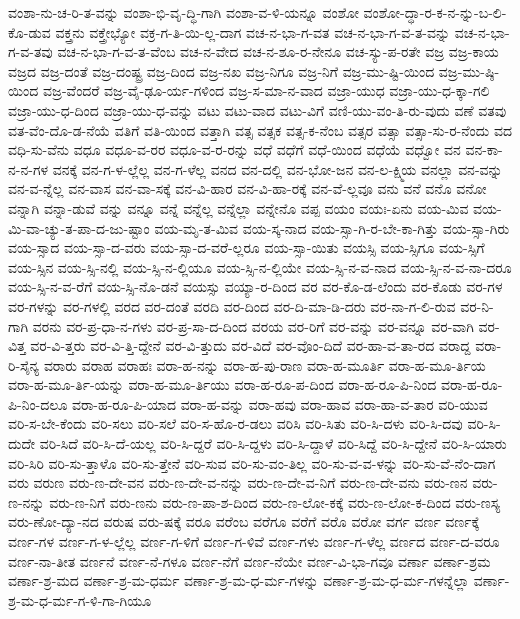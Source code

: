 {ವಂಶಾ-ನು-ಚ-ರಿ-ತ-ವನ್ನು
ವಂಶಾ-ಭಿ-ವೃ-ದ್ಧಿ-ಗಾಗಿ
ವಂಶಾ-ವ-ಳಿ-ಯನ್ನೂ
ವಂಶೋ
ವಂಶೋ-ದ್ಧಾ-ರ-ಕ-ನ-ನ್ನು-ಬ-ಲಿ-ಕೊ-ಡುವ
ವಕ್ತ್ರನು
ವಕ್ತ್ರೇಭ್ಯೋ
ವಕ್ರ-ಗ-ತಿ-ಯಿ-ಲ್ಲ-ದಾಗ
ವಚ-ನ-ಭಾ-ಗ-ವತ
ವಚ-ನ-ಭಾ-ಗ-ವ-ತ-ವನ್ನು
ವಚ-ನ-ಭಾ-ಗ-ವ-ತವು
ವಚ-ನ-ಭಾ-ಗ-ವ-ತ-ವೆಂಬ
ವಚ-ನ-ವೇದ
ವಚ-ನ-ಶೂ-ರ-ನೇನೂ
ವಚ-ಸ್ಯು-ಪ-ರತೇ
ವಜ್ರ
ವಜ್ರ-ಕಾಯ
ವಜ್ರದ
ವಜ್ರ-ದಂತೆ
ವಜ್ರ-ದಂಷ್ಟ್ರ
ವಜ್ರ-ದಿಂದ
ವಜ್ರ-ನಖ
ವಜ್ರ-ನಿಗೂ
ವಜ್ರ-ನಿಗೆ
ವಜ್ರ-ಮು-ಷ್ಟಿ-ಯಿಂದ
ವಜ್ರ-ಮು-ಷ್ಠಿ-ಯಿಂದ
ವಜ್ರ-ವೆಂದರೆ
ವಜ್ರ-ವೈ-ಢೂ-ರ್ಯ-ಗಳಿಂದ
ವಜ್ರ-ಸ-ಮಾ-ನ-ವಾದ
ವಜ್ರಾ-ಯುಧ
ವಜ್ರಾ-ಯು-ಧ-ಕ್ಕಾ-ಗಲಿ
ವಜ್ರಾ-ಯು-ಧ-ದಿಂದ
ವಜ್ರಾ-ಯು-ಧ-ವನ್ನು
ವಟು
ವಟು-ವಾದ
ವಟು-ವಿಗೆ
ವಣಿ-ಯು-ವಂ-ತಿ-ರು-ವುದು
ವಣೆ
ವತವು
ವತ-ವೆಂ-ದೊ-ಡ-ನೆಯೆ
ವತಿಗೆ
ವತಿ-ಯಿಂದ
ವತ್ತಾಗಿ
ವತ್ಸ
ವತ್ಸಕ
ವತ್ಸ-ಕ-ನೆಂಬ
ವತ್ಸರ
ವತ್ಸಾ
ವತ್ಸಾ-ಸು-ರ-ನೆಂದು
ವದ
ವಧಿ-ಸು-ವೆನು
ವಧೂ
ವಧೂ-ವ-ರರ
ವಧೂ-ವ-ರ-ರನ್ನು
ವಧೆ
ವಧೆಗೆ
ವಧೆ-ಯಿಂದ
ವಧೆಯೆ
ವಧ್ವೋ
ವನ
ವನ-ಕಾ-ನ-ನ-ಗಳ
ವನಕ್ಕೆ
ವನ-ಗ-ಳ-ಲ್ಲೆಲ್ಲ
ವನ-ಗ-ಳೆಲ್ಲ
ವನದ
ವನ-ದಲ್ಲಿ
ವನ-ಭೋ-ಜನ
ವನ-ಲ-ಕ್ಷ್ಮಿಯ
ವನಲ್ಲಾ
ವನ-ವನ್ನು
ವನ-ವ-ನ್ನೆಲ್ಲ
ವನ-ವಾಸ
ವನ-ವಾ-ಸಕ್ಕೆ
ವನ-ವಿ-ಹಾರ
ವನ-ವಿ-ಹಾ-ರಕ್ಕೆ
ವನ-ವೆ-ಲ್ಲವೂ
ವನು
ವನೆ
ವನೊ
ವನೋ
ವನ್ನಾಗಿ
ವನ್ನಾ-ಡುವೆ
ವನ್ನು
ವನ್ನೂ
ವನ್ನೆ
ವನ್ನೆಲ್ಲ
ವನ್ನೆಲ್ಲಾ
ವನ್ನೇನೊ
ವಪ್ಪ
ವಯಂ
ವಯಃ-ಏನು
ವಯ-ಮಿವ
ವಯ-ಮಿ-ವಾ-ಚ್ಯು-ತ-ಪಾ-ದ-ಜು-ಷ್ಟಾಂ
ವಯ-ಮೃ-ತ-ಮಿವ
ವಯ-ಸ್ಕ-ನಾದ
ವಯ-ಸ್ಸಾ-ಗಿ-ರ-ಬೇ-ಕಾ-ಗಿತ್ತು
ವಯ-ಸ್ಸಾ-ಗಿರು
ವಯ-ಸ್ಸಾದ
ವಯ-ಸ್ಸಾ-ದ-ವರು
ವಯ-ಸ್ಸಾ-ದ-ವರೆ-ಲ್ಲರೂ
ವಯ-ಸ್ಸಾ-ಯಿತು
ವಯಸ್ಸಿ
ವಯ-ಸ್ಸಿಗೂ
ವಯ-ಸ್ಸಿಗೆ
ವಯ-ಸ್ಸಿನ
ವಯ-ಸ್ಸಿ-ನಲ್ಲಿ
ವಯ-ಸ್ಸಿ-ನ-ಲ್ಲಿಯೂ
ವಯ-ಸ್ಸಿ-ನ-ಲ್ಲಿಯೇ
ವಯ-ಸ್ಸಿ-ನ-ವ-ನಾದ
ವಯ-ಸ್ಸಿ-ನ-ವ-ನಾ-ದರೂ
ವಯ-ಸ್ಸಿ-ನ-ವ-ರೆಗೆ
ವಯ-ಸ್ಸಿ-ನೊ-ಡನೆ
ವಯಸ್ಸು
ವಯ್ಯಾ-ರ-ದಿಂದ
ವರ
ವರ-ಕೊ-ಡ-ಲೆಂದು
ವರ-ಕೊಡು
ವರ-ಗಳ
ವರ-ಗಳನ್ನು
ವರ-ಗಳಲ್ಲಿ
ವರದ
ವರ-ದಂತೆ
ವರದಿ
ವರ-ದಿಂದ
ವರ-ದಿ-ಮಾ-ಡಿ-ದರು
ವರ-ನಾ-ಗ-ಲಿ-ರುವ
ವರ-ನಿ-ಗಾಗಿ
ವರನು
ವರ-ಪ್ರ-ಧಾ-ನ-ಗಳು
ವರ-ಪ್ರ-ಸಾ-ದ-ದಿಂದ
ವರಯ
ವರ-ರಿಗೆ
ವರ-ವನ್ನು
ವರ-ವನ್ನೂ
ವರ-ವಾಗಿ
ವರ-ವಿತ್ತ
ವರ-ವಿ-ತ್ತರು
ವರ-ವಿ-ತ್ತಿ-ದ್ದೇನೆ
ವರ-ವಿ-ತ್ತುದು
ವರ-ವಿದೆ
ವರ-ವೊಂ-ದಿದೆ
ವರ-ಹಾ-ವ-ತಾ-ರದ
ವರಾದ್ದ
ವರಾ-ರಿ-ಸೈನ್ಯ
ವರಾರು
ವರಾಹ
ವರಾಹಃ
ವರಾ-ಹ-ನನ್ನು
ವರಾ-ಹ-ಪು-ರಾಣ
ವರಾ-ಹ-ಮೂರ್ತಿ
ವರಾ-ಹ-ಮೂ-ರ್ತಿಯ
ವರಾ-ಹ-ಮೂ-ರ್ತಿ-ಯನ್ನು
ವರಾ-ಹ-ಮೂ-ರ್ತಿಯು
ವರಾ-ಹ-ರೂ-ಪ-ದಿಂದ
ವರಾ-ಹ-ರೂ-ಪಿ-ನಿಂದ
ವರಾ-ಹ-ರೂ-ಪಿ-ನಿಂ-ದಲೂ
ವರಾ-ಹ-ರೂ-ಪಿ-ಯಾದ
ವರಾ-ಹ-ವನ್ನು
ವರಾ-ಹವು
ವರಾ-ಹಾವ
ವರಾ-ಹಾ-ವ-ತಾರ
ವರಿ-ಯುವ
ವರಿ-ಸ-ಬೇ-ಕೆಂದು
ವರಿ-ಸಲು
ವರಿ-ಸಲೆ
ವರಿ-ಸ-ಹೊ-ರ-ಡಲು
ವರಿಸಿ
ವರಿ-ಸಿತು
ವರಿ-ಸಿ-ದಳು
ವರಿ-ಸಿ-ದವು
ವರಿ-ಸಿ-ದುದೇ
ವರಿ-ಸಿದೆ
ವರಿ-ಸಿ-ದೆ-ಯಲ್ಲ
ವರಿ-ಸಿ-ದ್ದರೆ
ವರಿ-ಸಿ-ದ್ದಳು
ವರಿ-ಸಿ-ದ್ದಾಳೆ
ವರಿ-ಸಿದ್ದೆ
ವರಿ-ಸಿ-ದ್ದೇನೆ
ವರಿ-ಸಿ-ಯಾರು
ವರಿ-ಸಿರಿ
ವರಿ-ಸು-ತ್ತಾಳೊ
ವರಿ-ಸು-ತ್ತೇನೆ
ವರಿ-ಸುವ
ವರಿ-ಸು-ವಂ-ತಿಲ್ಲ
ವರಿ-ಸು-ವ-ವ-ಳನ್ನು
ವರಿ-ಸು-ವೆ-ನೆಂ-ದಾಗ
ವರು
ವರುಣ
ವರು-ಣ-ದೇ-ವನ
ವರು-ಣ-ದೇ-ವ-ನನ್ನು
ವರು-ಣ-ದೇ-ವ-ನಿಗೆ
ವರು-ಣ-ದೇ-ವನು
ವರು-ಣನ
ವರು-ಣ-ನನ್ನು
ವರು-ಣ-ನಿಗೆ
ವರು-ಣನು
ವರು-ಣ-ಪಾ-ಶ-ದಿಂದ
ವರು-ಣ-ಲೋ-ಕಕ್ಕೆ
ವರು-ಣ-ಲೋ-ಕ-ದಿಂದ
ವರು-ಣಸ್ಯ
ವರು-ಣೋ-ದ್ಯಾ-ನದ
ವರುಷ
ವರು-ಷಕ್ಕೆ
ವರೂ
ವರೆಂಬ
ವರೆಗೂ
ವರೆಗೆ
ವರೊ
ವರೋ
ವರ್ಗ
ವರ್ಣ
ವರ್ಣಕ್ಕೆ
ವರ್ಣ-ಗಳ
ವರ್ಣ-ಗ-ಳ-ಲ್ಲೆಲ್ಲ
ವರ್ಣ-ಗ-ಳಿಗೆ
ವರ್ಣ-ಗ-ಳಿವೆ
ವರ್ಣ-ಗಳು
ವರ್ಣ-ಗ-ಳೆಲ್ಲ
ವರ್ಣದ
ವರ್ಣ-ದ-ವರೂ
ವರ್ಣ-ನಾ-ತೀತ
ವರ್ಣನೆ
ವರ್ಣ-ನೆ-ಗಳೂ
ವರ್ಣ-ನೆಗೆ
ವರ್ಣ-ನೆಯೇ
ವರ್ಣ-ವಿ-ಭಾ-ಗವೂ
ವರ್ಣಾ
ವರ್ಣಾ-ಶ್ರಮ
ವರ್ಣಾ-ಶ್ರ-ಮದ
ವರ್ಣಾ-ಶ್ರ-ಮ-ಧರ್ಮ
ವರ್ಣಾ-ಶ್ರ-ಮ-ಧ-ರ್ಮ-ಗಳನ್ನು
ವರ್ಣಾ-ಶ್ರ-ಮ-ಧ-ರ್ಮ-ಗಳನ್ನೆಲ್ಲಾ
ವರ್ಣಾ-ಶ್ರ-ಮ-ಧ-ರ್ಮ-ಗ-ಳಿ-ಗಾ-ಗಿಯೂ
}
